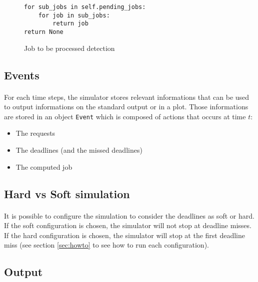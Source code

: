 \documentclass[letterpaper]{article}
\begin{document}
\begin{figure}[H]
    \begin{lstlisting}
for sub_jobs in self.pending_jobs:
    for job in sub_jobs:
        return job
return None
    \end{lstlisting}
    \caption{Job to be processed detection}
    \label{fig:pending_jobs}
\end{figure}

\subsection{Events}

\label{sec:events}

\paragraph{}

For each time steps, the simulator stores relevant informations that can
be used to output informations on the standard output or in a plot.
Those informations are stored in an object \texttt{Event}
which is composed of actions that occurs at time $t$:
\begin{itemize}
  \item The requests
  \item The deadlines (and the missed deadlines)
  \item The computed job
\end{itemize}

\subsection{Hard vs Soft simulation}

\paragraph{}


It is possible to configure the simulation to consider the deadlines as
soft or hard. If the soft configuration is chosen, the simulator will
not stop at deadline misses. If the hard configuration is chosen, the
simulator will stop at the first deadline miss (see section \ref{sec:howto}
to see how to run each configuration).

\subsection{Output}

\paragraph{}
\end{document}
